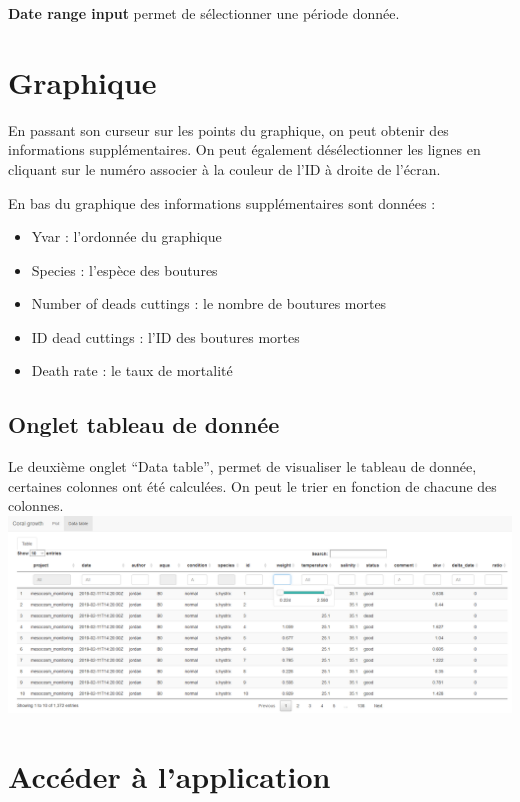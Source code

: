 \documentclass[]{book}
\providecommand{\tightlist}{%
  \setlength{\itemsep}{0pt}\setlength{\parskip}{0pt}}
\begin{document}
\textbf{Date range input} permet de sélectionner une période donnée.

\section{Graphique}\label{graphique}

En passant son curseur sur les points du graphique, on peut obtenir des
informations supplémentaires. On peut également désélectionner les
lignes en cliquant sur le numéro associer à la couleur de l'ID à droite
de l'écran.

En bas du graphique des informations supplémentaires sont données :

\begin{itemize}
\tightlist
\item
  Yvar : l'ordonnée du graphique
\item
  Species : l'espèce des boutures
\item
  Number of deads cuttings : le nombre de boutures mortes
\item
  ID dead cuttings : l'ID des boutures mortes
\item
  Death rate : le taux de mortalité
\end{itemize}

\subsection{Onglet tableau de donnée}\label{onglet-tableau-de-donnee}

Le deuxième onglet ``Data table'', permet de visualiser le tableau de
donnée, certaines colonnes ont été calculées. On peut le trier en
fonction de chacune des colonnes.
\includegraphics{image/notebook-table1.png}

\section{Accéder à l'application}\label{acceder-a-lapplication}
\end{document}
